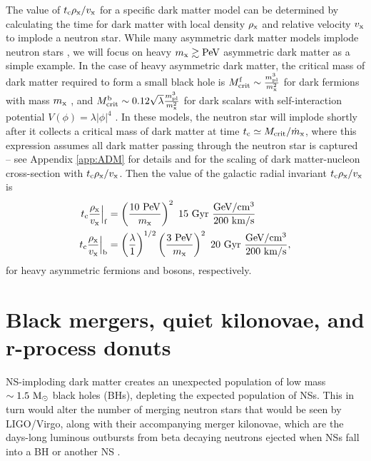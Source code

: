 \documentclass[nofootinbib,longbibliography,prd,floatfix,superscriptaddress,twocolumn]{revtex4-1}
\begin{document}
The value of $t_{\rm c} \rho_{\rm x} /v_{\rm x} $ for a specific dark matter model can be determined by calculating the time for dark matter with local density $\rho_{\rm x}$ and relative velocity $v_{\rm x}$ to implode a neutron star. While many asymmetric dark matter models implode neutron stars \cite{Bramante:2014zca,Bramante:2015dfa,Goldman:1989nd,deLavallaz:2010wp,Kouvaris:2010jy,McDermott:2011jp,Bramante:2013hn,Bell:2013xk,
Kouvaris:2011gb,Bramante:2013nma,Bramante:2015dfa,Bramante:2015cua,Bramante:2016mzo}, we will focus on heavy $m_{\rm x} \gtrsim {\rm PeV}$ asymmetric dark matter as a simple example. In the case of heavy asymmetric dark matter, the critical mass of dark matter required to form a small black hole is $M_{\rm crit}^{\rm f} \sim \frac{m_{\rm pl}^3}{m_{\rm x}^2}$ for dark fermions with mass $m_{\rm x}$ \cite{Bramante:2015cua}, and $M_{\rm crit}^{\rm b} \sim 0.12 \sqrt{\lambda} \frac{m_{\rm pl}^3}{m_{\rm x}^2}$ for dark scalars with self-interaction potential $V(\phi) = \lambda |\phi|^4$ \cite{Colpi:1986ye}. In these models, the neutron star will implode shortly after it collects a critical mass of dark matter at time $t_{\rm c} \simeq M_{\rm crit} / \dot{m}_{\rm x}$, where this expression assumes all dark matter passing through the neutron star is captured -- see Appendix \ref{app:ADM} for details and for the scaling of dark matter-nucleon cross-section with $t_{\rm c} \rho_{\rm x} /v_{\rm x} $. Then the value of the galactic radial invariant $t_{\rm c} \rho_{\rm x} /v_{\rm x} $  is
\begin{align}
t_{\rm c} \frac{\rho_{\rm x}}{ v_{\rm x} } \Big|_{\rm f} &= \left( \frac{\rm 10~PeV}{m_{\rm x}} \right)^2~15~ {\rm Gyr}~ \frac{\rm GeV/cm^{3}}{\rm 200~ km/s} 
\nonumber \\
t_{\rm c} \frac{\rho_{\rm x}}{ v_{\rm x} } \Big|_{\rm b} &= \left( \frac{\lambda}{1} \right)^{1/2} \left( \frac{\rm 3~PeV}{m_{\rm x}} \right)^2~20~ {\rm Gyr} ~\frac{\rm GeV/cm^{3}}{\rm 200~ km/s},
\label{eq:tc}
\end{align}
for heavy asymmetric fermions and bosons, respectively.

\section{Black mergers, quiet kilonovae, and r-process donuts}
\label{sec:pop}
NS-imploding dark matter creates an unexpected population of low mass $\sim1.5~{\rm M_{\odot}}$ black holes (BHs), depleting the expected population of NSs. This in turn would alter the number of merging neutron stars that would be seen by LIGO/Virgo, along with their accompanying merger kilonovae, which are the days-long luminous outbursts from beta decaying neutrons ejected when NSs fall into a BH or another NS \cite{1977ApJ...213..225L,Kasen:2013xka}.
\end{document}
